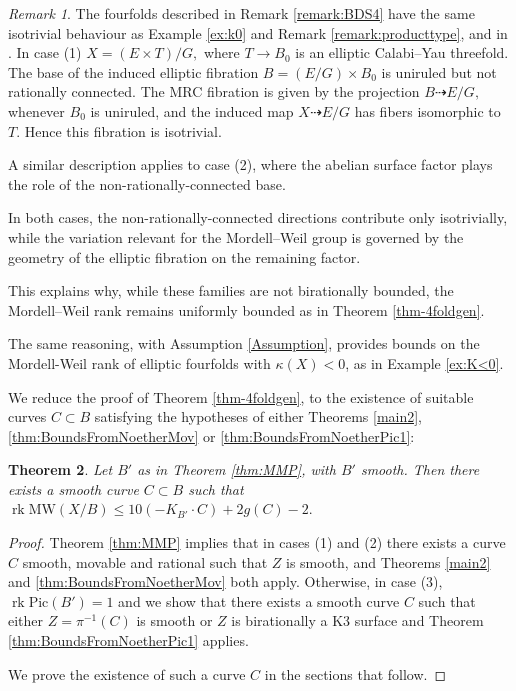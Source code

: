 \documentclass[11pt]{amsart}
\newtheorem{theorem}{Theorem}[section]
\theoremstyle{definition}
\theoremstyle{definition}
\theoremstyle{remark}
\newtheorem{remark}[theorem]{Remark}
\theoremstyle{remark}
\theoremstyle{definition}
\theoremstyle{conjecture}
\newcommand{\MW}{\mathrm{MW}}
\newcommand{\Pic}{\mathrm{Pic}}
\begin{document}
\smallskip


\begin{remark} 
The fourfolds described in Remark  \ref{remark:BDS4} have the same isotrivial behaviour as  Example \ref{ex:k0}  and Remark \ref{remark:producttype}, and in \cite{Birkar_2024}. In case (1) 
$
X = (E \times T)/G,
$
where $T \to B_0$ is an elliptic Calabi–Yau threefold. The base of the induced elliptic fibration 
$
B = (E/G) \times B_0
$
 is uniruled but not rationally connected. The MRC fibration is given by the projection
$B \dashrightarrow E/G,$  whenever $B_0$ is uniruled,
and the induced map
$X \dashrightarrow E/G$
has fibers isomorphic to $T$. Hence this fibration is isotrivial.

A similar description applies to case (2), where the abelian surface factor plays the role of the non-rationally-connected base. 

In both cases, the non-rationally-connected directions contribute only isotrivially, while the variation relevant for the Mordell–Weil group is governed by the geometry of the elliptic fibration on the remaining factor.

This explains why, while these families are not birationally bounded,  the Mordell–Weil rank remains uniformly bounded as in Theorem \ref{thm-4foldgen}.
\end{remark}


The same reasoning, with Assumption \ref{Assumption}, provides bounds on the Mordell-Weil rank of elliptic fourfolds with
$\kappa(X) <0$, as in Example \ref{ex:K<0}.

\vskip 0.2in

We reduce the proof of  Theorem \ref{thm-4foldgen}, to the existence of suitable curves $C \subset B$ satisfying the hypotheses of  either Theorems \ref{main2}, \ref{thm:BoundsFromNoetherMov} or \ref{thm:BoundsFromNoetherPic1}:

\begin{theorem} \label{them-existencecurve} Let $B'$  as in Theorem \ref{thm:MMP}, with $B'$ smooth. Then there exists a smooth curve $C \subset B$ such that 
	$\operatorname{rk} \MW(X/B) \leq 10 (-K_{B'} \cdot C ) +2 g(C) -2.$

   
\end{theorem}

\begin{proof} 
Theorem \ref{thm:MMP} implies that in cases (1) and (2) there exists a curve $C$ smooth, movable and rational  such that  $Z$ is smooth, and  Theorems \ref{main2}  and \ref{thm:BoundsFromNoetherMov} both apply. 
Otherwise, in case (3), $\operatorname{rk} \Pic (B')=1$ and we show that there exists a smooth curve $C$  such that either $Z=\pi^{-1}(C)$ is smooth  or $Z$ is birationally a K3 surface and  Theorem \ref{thm:BoundsFromNoetherPic1}  applies.

We prove the existence of such a  curve $C$ in the  sections that follow.
\end{proof}
\end{document}
